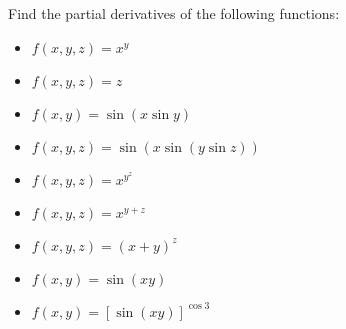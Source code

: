 \documentclass[12pt]{article}
\newenvironment{problem}[2][Problem]{\begin{trivlist}
\item[\hskip \labelsep {\bfseries #1}\hskip \labelsep {\bfseries #2.}]}{\end{trivlist}}
\begin{document}
\begin{problem}{2.17}
Find the partial derivatives of the following functions:
\begin{itemize}
	\item $f\left(x,y,z\right) = x^y$
	\item $f\left(x,y,z\right) = z$
	\item $f\left(x,y\right) = \sin \left(x \sin y\right)$
	\item $f\left(x,y,z\right) = \sin \left( x \sin \left(y \sin z\right)\right)$
	\item $f\left(x,y,z\right) = x^{y^z}$
	\item $f\left(x,y,z\right) = x^{y+z} $
	\item $f\left(x,y,z\right) = \left(x+y\right)^z$
	\item $f\left(x,y\right) = \sin\left(xy\right)$
	\item $f\left(x,y\right) = \left[\sin \left(xy\right)\right]^{\cos 3} $
\end{itemize}
\end{problem}
\end{document}
